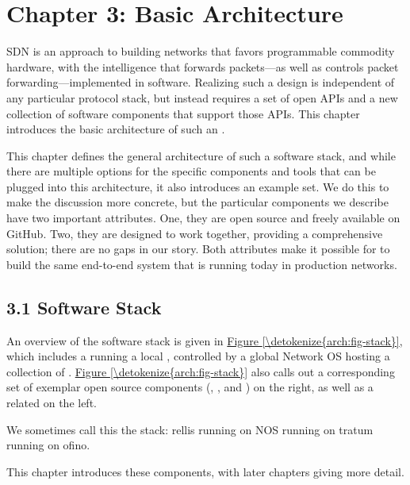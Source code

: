 \documentclass[letterpaper,11pt,english]{sphinxmanual}
\begin{document}
\chapter{Chapter 3:  Basic Architecture}
\label{\detokenize{arch:chapter-3-basic-architecture}}\label{\detokenize{arch::doc}}
SDN is an approach to building networks that favors programmable
commodity hardware, with the intelligence that forwards packets—as
well as controls packet forwarding—implemented in software. Realizing
such a design is independent of any particular protocol stack, but
instead requires a set of open APIs and a new collection of software
components that support those APIs. This chapter introduces the basic
architecture of such an .

This chapter defines the general architecture of such a software
stack, and while there are multiple options for the specific
components and tools that can be plugged into this architecture, it
also introduces an example set. We do this to make the discussion more
concrete, but the particular components we describe have two important
attributes. One, they are open source and freely available on GitHub.
Two, they are designed to work together, providing a comprehensive
solution; there are no gaps in our story. Both attributes make it
possible for  to build the same end-to-end system that is
running today in production networks.


\section{3.1 Software Stack}
\label{\detokenize{arch:software-stack}}
An overview of the software stack is given in \hyperref[\detokenize{arch:fig-stack}]{Figure \ref{\detokenize{arch:fig-stack}}}, which includes a  running a local
, controlled by a global Network OS hosting a collection of
. \hyperref[\detokenize{arch:fig-stack}]{Figure \ref{\detokenize{arch:fig-stack}}} also calls out
a corresponding set of exemplar open source components (,
, and ) on the right, as well as a related  on the left.%
\begin{footnote}[1]\sphinxAtStartFootnote
We sometimes call this the  stack: rellis running
on NOS running on tratum running on ofino.
%
\end{footnote} This chapter introduces these components, with
later chapters giving more detail.
\end{document}
